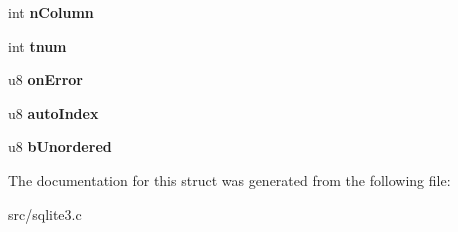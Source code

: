 \begin{DoxyCompactItemize}
\item 
\hypertarget{struct_index_ac583449830c285a52d1fd10b8c890162}{int {\bfseries n\-Column}}\label{struct_index_ac583449830c285a52d1fd10b8c890162}

\item 
\hypertarget{struct_index_af895a09c01701021c3e36362c04a1ae6}{int {\bfseries tnum}}\label{struct_index_af895a09c01701021c3e36362c04a1ae6}

\item 
\hypertarget{struct_index_ae8bf87d0414e5c46b86192cfbdd271a7}{u8 {\bfseries on\-Error}}\label{struct_index_ae8bf87d0414e5c46b86192cfbdd271a7}

\item 
\hypertarget{struct_index_a1fa09182749b6e07b2555d5b3dffb91d}{u8 {\bfseries auto\-Index}}\label{struct_index_a1fa09182749b6e07b2555d5b3dffb91d}

\item 
\hypertarget{struct_index_a1a3114080bcca1d9dd23ce5755d4e4e8}{u8 {\bfseries b\-Unordered}}\label{struct_index_a1a3114080bcca1d9dd23ce5755d4e4e8}

\end{DoxyCompactItemize}


The documentation for this struct was generated from the following file\-:\begin{DoxyCompactItemize}
\item 
src/sqlite3.\-c\end{DoxyCompactItemize}

